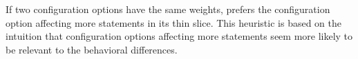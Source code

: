 If two configuration options have the
same weights, \ourtool prefers the configuration option
affecting more statements in its thin slice. This heuristic
is based on the intuition that configuration options affecting
more statements seem more likely to be relevant to the behavioral
differences.












%



